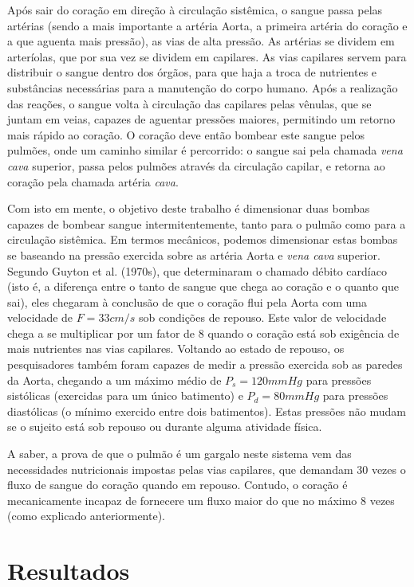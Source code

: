 \documentclass[12pt, a4paper, twoside]{article}
\begin{document}
Após sair do coração em direção à circulação sistêmica, o sangue passa pelas artérias (sendo a mais importante a artéria Aorta, a primeira artéria do coração e a que aguenta mais pressão), as vias de alta pressão. As artérias se dividem em arteríolas, que por sua vez se dividem em capilares. As vias capilares servem para distribuir o sangue dentro dos órgãos, para que haja a troca de nutrientes e substâncias necessárias para a manutenção do corpo humano. Após a realização das reações, o sangue volta à circulação das capilares pelas vênulas, que se juntam em veias, capazes de aguentar pressões maiores, permitindo um retorno mais rápido ao coração. O coração deve então bombear este sangue pelos pulmões, onde um caminho similar é percorrido: o sangue sai pela chamada \textit{vena cava} superior, passa pelos pulmões através da circulação capilar, e retorna ao coração pela chamada artéria \textit{cava}.

Com isto em mente, o objetivo deste trabalho é dimensionar duas bombas capazes de bombear sangue intermitentemente, tanto para o pulmão como para a circulação sistêmica. Em termos mecânicos, podemos dimensionar estas bombas se baseando na pressão exercida sobre as artéria Aorta e \textit{vena cava} superior. Segundo Guyton et al. (1970s), que determinaram o chamado débito cardíaco (isto é, a diferença entre o tanto de sangue que chega ao coração e o quanto que sai), eles chegaram à conclusão de que o coração flui pela Aorta com uma velocidade de $F=33cm/s$ sob condições de repouso. Este valor de velocidade chega a se multiplicar por um fator de 8 quando o coração está sob exigência de mais nutrientes nas vias capilares. Voltando ao estado de repouso, os pesquisadores também foram capazes de medir a pressão exercida sob as paredes da Aorta, chegando a um máximo médio de $P_s=120mmHg$ para pressões sistólicas (exercidas para um único batimento) e $P_d=80mmHg$ para pressões diastólicas (o mínimo exercido entre dois batimentos). Estas pressões não mudam se o sujeito está sob repouso ou durante alguma atividade física.

A saber, a prova de que o pulmão é um gargalo neste sistema vem das necessidades nutricionais impostas pelas vias capilares, que demandam 30 vezes o fluxo de sangue do coração quando em repouso. Contudo, o coração é mecanicamente incapaz de fornecere um fluxo maior do que no máximo 8 vezes (como explicado anteriormente).

\section{Resultados}
\end{document}
